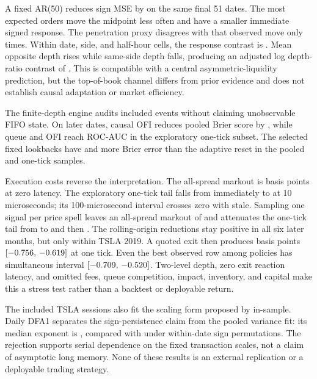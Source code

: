 \documentclass[11pt,a4paper]{article}
\begin{document}
A fixed AR(50) reduces sign MSE by \SignArMseReduction{} on the same final 51
dates. The most expected orders move the midpoint \ObservedMoveContrast{} less
often and have a \MidpointResponseContrast{} smaller immediate signed response.
The penetration proxy disagrees with that observed move only
\ProxyMoveDisagreements{} times. Within date, side, and half-hour cells, the
response contrast is \IntradayMidpointResponseContrast{}. Mean opposite depth
rises while same-side depth falls, producing an adjusted log depth-ratio
contrast of \IntradayDepthAsymmetryContrast{}. This is compatible with a central
asymmetric-liquidity prediction, but the top-of-book channel differs from prior
evidence and does not establish causal adaptation or market efficiency.

The finite-depth engine audits \ReplayEvents{} included events without claiming
unobservable FIFO state. On later dates, causal OFI reduces pooled Brier score
by \CombinedAllBrierReduction{}, while queue and OFI reach ROC-AUC
\CombinedOneTickAuc{} in the exploratory one-tick subset. The selected fixed
lookbacks have \OfiFixedAllPenalty{} and \OfiFixedOneTickPenalty{} more Brier
error than the adaptive reset in the pooled and one-tick samples.

Execution costs reverse the interpretation. The all-spread markout is
\MarkoutAllZeroNet{} basis points at zero latency. The exploratory one-tick tail
falls from \MarkoutOneTickZeroNet{} immediately to \MarkoutOneTickTenNet{} at
10 microseconds; its 100-microsecond interval crosses zero with
\MarkoutOneTickHundredStale{} stale. Sampling one signal per price spell leaves
an all-spread markout of \LandmarkAllZeroNet{} and attenuates the one-tick tail
from \LandmarkOneTickZeroNet{} to \LandmarkOneTickTenNet{} and then
\LandmarkOneTickHundredNet{}. The rolling-origin reductions stay positive in
all six later months, but only within TSLA 2019. A quoted exit then produces
\RoundTripOneOnePnl{} basis points
$[-0.756{},\,-0.619{}]$ at one tick. Even the
best observed row among \PolicyFamilyRows{} policies has simultaneous interval
$[-0.709{},\,-0.520{}]$. Two-level depth, zero exit
reaction latency, and omitted fees, queue competition, impact, inventory, and
capital make this a stress test rather than a backtest or deployable return.

The included TSLA sessions also fit the scaling form proposed by
\citet{patzelt2018} in-sample. Daily DFA1 separates the sign-persistence claim
from the pooled variance fit: its median exponent is \DfaMedianExponent{},
compared with \DfaNullMedianExponent{} under within-date sign permutations.
The rejection supports serial dependence on the fixed transaction scales, not
a claim of asymptotic long memory. None of these results is an external
replication or a deployable trading strategy.

\begingroup
\small
\setlength{\bibsep}{0pt}


\endgroup
\end{document}
